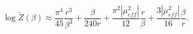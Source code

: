 \begin{equation}
\log \widetilde{Z}\left(\beta \right)\approx \frac{\pi ^{4}}{45}\frac{r^{3}}{\beta ^{3}}+\frac{\beta }{240r}+\frac{\pi ^{2}\left|\mu _{eff}^{2}\right|}{12}\frac{r}{\beta }+\frac{3\left|\mu _{eff}^{2}\right|}{16}\frac{\beta }{r}.\end{equation}

